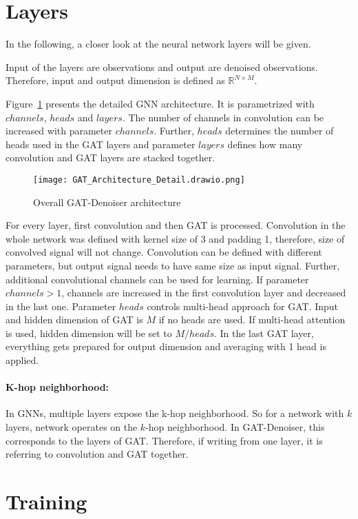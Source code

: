 \section{Layers}
In the following, a closer look at the neural network layers will be given.

Input of the layers are observations and output are denoised observations.
Therefore, input and output dimension is defined as  $\mathbb{R}^{N \times M}$. 

Figure~\ref{fig:architecture-detailed} presents the detailed GNN architecture.
It is parametrized with $channels$, $heads$ and $layers$. 
The number of channels in convolution can be increased with parameter $channels$.
Further, $heads$ determines the number of heads used in the GAT layers and parameter 
$layers$ defines how many convolution and GAT layers are stacked together.

\begin{figure}[H]
  \centering
  \texttt{[image: GAT\_Architecture\_Detail.drawio.png]}
  \caption{Overall GAT-Denoiser architecture}
  \label{fig:architecture-detailed}
\end{figure}


For every layer, first convolution and then GAT is processed. 
Convolution in the whole network was defined with kernel size of 3 and padding 1,
therefore, size of convolved signal will not change. 
Convolution can be defined with different parameters, but output signal needs to have 
same size as input signal.
Further, additional convolutional channels can be used for learning.
If parameter $channels > 1$, channels are increased in the first convolution layer 
and decreased in the last one.
Parameter $heads$ controls multi-head approach for GAT. Input and hidden dimension
of GAT is $M$ if no heads are used.
If multi-head attention is used, hidden dimension will be set to $M / heads$.
In the last GAT layer, everything gets prepared for output dimension and 
averaging with 1 head is applied.

\paragraph{K-hop neighborhood:}
In GNNs, multiple layers expose the k-hop neighborhood. So for a network with $k$ layers,
network operates on the $k$-hop neighborhood. In GAT-Denoiser, this corresponds
to the layers of GAT. Therefore, if writing from one layer, it is referring to convolution and GAT together.

\section{Training}

